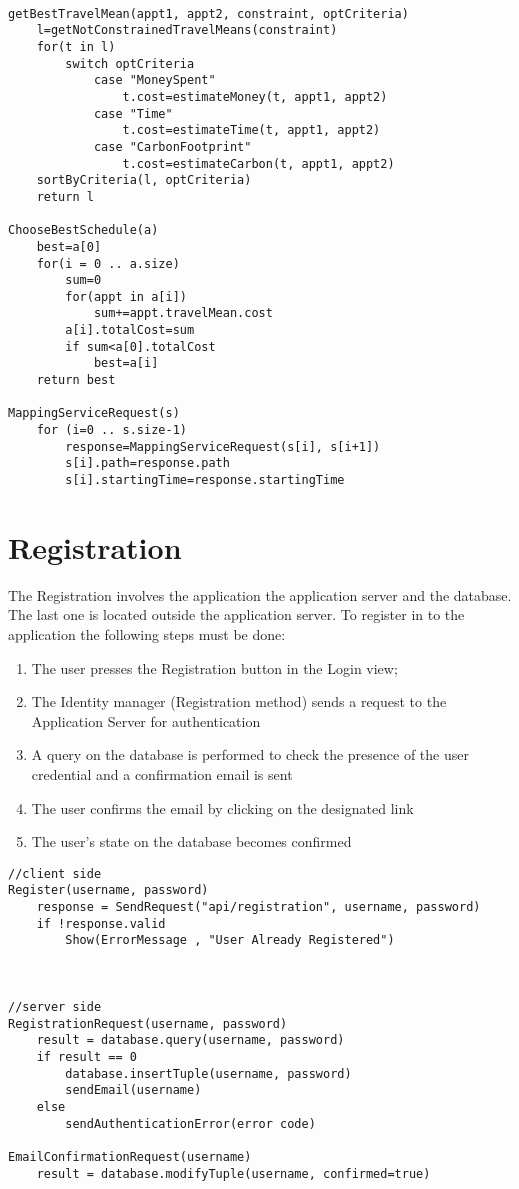 \begin{lstlisting}
					
getBestTravelMean(appt1, appt2, constraint, optCriteria)
	l=getNotConstrainedTravelMeans(constraint)
	for(t in l)
		switch optCriteria
			case "MoneySpent"
				t.cost=estimateMoney(t, appt1, appt2)
			case "Time"
				t.cost=estimateTime(t, appt1, appt2)
			case "CarbonFootprint"
				t.cost=estimateCarbon(t, appt1, appt2)
	sortByCriteria(l, optCriteria)
	return l
	
ChooseBestSchedule(a)
	best=a[0]
	for(i = 0 .. a.size)
		sum=0
		for(appt in a[i])
			sum+=appt.travelMean.cost
		a[i].totalCost=sum
		if sum<a[0].totalCost
			best=a[i]
	return best
	
MappingServiceRequest(s)
	for (i=0 .. s.size-1)
		response=MappingServiceRequest(s[i], s[i+1])
		s[i].path=response.path
		s[i].startingTime=response.startingTime

\end{lstlisting}

\section{Registration}
The Registration involves the application the application server and the database. The last one is located outside the application server. 
To register in to the application the following steps must be done:
\begin{enumerate}
\item The user presses the Registration button in the Login view;
\item The Identity manager (Registration method) sends a request to the Application Server for authentication
\item A query on the database is performed to check the presence of the user credential and a confirmation email is sent
\item The user confirms the email by clicking on the designated link
\item The user's state on the database becomes confirmed
\end{enumerate}

\begin{lstlisting}
//client side
Register(username, password)
	response = SendRequest("api/registration", username, password)
	if !response.valid
		Show(ErrorMessage , "User Already Registered")
		

	
//server side
RegistrationRequest(username, password)
	result = database.query(username, password)
	if result == 0
		database.insertTuple(username, password)
		sendEmail(username)
	else
		sendAuthenticationError(error code)
		
EmailConfirmationRequest(username)
	result = database.modifyTuple(username, confirmed=true)
\end{lstlisting}






		
